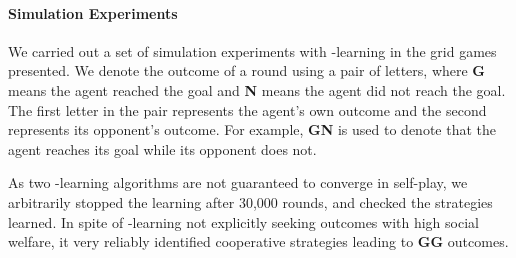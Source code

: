 
\vspace{\up}
\paragraph{Simulation Experiments}
\label{sec:qlearning}

We carried out a set of simulation experiments with \Q-learning in
the grid games presented.
%
We denote the outcome of a round using a pair of letters, where {\bf G} 
means the agent reached the goal and {\bf N} means the agent did not
reach the goal. The first letter in the pair represents the agent's
own outcome and the second represents its opponent's outcome. For
example, {\bf GN} is used to denote that the agent reaches its goal
while its opponent does not.

As two \Q-learning algorithms are not guaranteed to converge in
self-play, we arbitrarily stopped the learning after 30,000 rounds,
and checked the strategies learned.  In spite of \Q-learning not
explicitly seeking outcomes with high social welfare, it very reliably
identified cooperative strategies leading to {\bf GG} outcomes.

